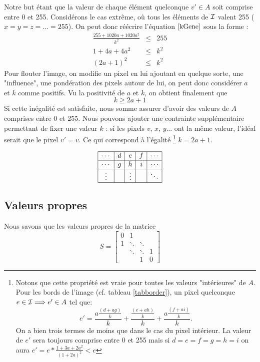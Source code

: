 Notre but étant que la valeur de chaque élément quelconque $v' \in A$	soit comprise entre 0 et 255. 
Considérons le cas extrême, où tous les éléments de $\mathcal{I}$ valent 255 ($x=y=z=...=255$).
On peut donc réécrire l'équation $\ref{kGene}$ sous la forme :
\begin{eqnarray}
\frac{255+1020a+1020a^2}{k^2} &\leq & 255 \\
1+4a+4a^2 &\leq & k^2 \\
(2a+1)^2 &\leq & k^2
\end{eqnarray}
Pour flouter l'image, on modifie un pixel en lui ajoutant en quelque sorte, une "influence", une pondération des pixels autour de lui, on peut donc considérer $a$ et $k$ comme positifs.  
Vu la positivité de $a$ et $k$, on obtient finalement que
\begin{equation}
k \geq 2a+1
\end{equation}
Si cette inégalité est satisfaite, nous somme assurer d'avoir des valeurs de $A$ comprises entre 0 et 255. Nous  pouvons ajouter une contrainte supplémentaire permettant de fixer une valeur $k$ : si les pixels $v$, $x$, $y$... ont la même valeur, l'idéal serait que le pixel $v'=v$. Ce qui correspond à l'égalité \footnote{Notons que cette propriété est vraie pour toutes les valeurs "intérieures" de $A$. Pour les bords de l'image (cf. tableau \ref{tabborder}), un pixel quelconque $e \in \mathcal{I} \Longrightarrow e' \in A$ tel que:  
$$e' = \frac{a \frac{(d+ag)}{k}}{k} + \frac{ \frac{(e+ah)}{k}}{k} + \frac{a \frac{(f+ai)}{k}}{k} . $$ On a bien trois termes de moins que dans le cas du pixel intérieur. La valeur de $e'$ sera toujours comprise entre 0 et 255 mais si $d=e=f=g=h=i$ on aura $e'= e * \frac{1+3a+2a^2}{(1+2a)^2} < e$ }  $k=2a+1$. 

$$
\begin{array}{|c|c|c|c|c|} 
\hline
\cdots & d & e & f & \cdots\\
\hline
\cdots & g & h & i & \cdots\\
\hline
\vdots &  & \vdots &  & \ddots \\
\hline
\end{array} \label{tabborder}
$$

\subsection{Valeurs propres}
Nous savons que les valeurs propres de la matrice
$$
S =
 \begin{bmatrix}
    0 & 1 		& 			& \\
    1 & \ddots 	& \ddots 	& \\
      & \ddots 	& \ddots 	& 1 \\
      & 		& 1			& 0
  \end{bmatrix}
$$

